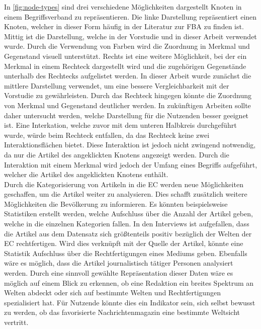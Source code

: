 In \autoref{fig:node-types} sind drei verschiedene Möglichkeiten dargestellt Knoten in einem Begriffsverband zu repräsentieren.
Die linke Darstellung repräsentiert einen Knoten, welcher in dieser Form häufig in der Literatur zur \ac{FBA} zu finden ist.
Mittig ist die Darstellung, welche in der Vorstudie und in dieser Arbeit verwendet wurde.
Durch die Verwendung von Farben wird die Zuordnung in Merkmal und Gegenstand visuell unterstützt.
Rechts ist eine weitere Möglichkeit, bei der ein Merkmal in einem Rechteck dargestellt wird und die zugehörigen Gegenstände unterhalb des Rechtecks aufgelistet werden.
In dieser Arbeit wurde zunächst die mittlere Darstellung verwendet, um eine bessere Vergleichbarkeit mit der Vorstudie zu gewährleisten.
Durch das Rechteck hingegen könnte die Zuordnung von Merkmal und Gegenstand deutlicher werden.
In zukünftigen Arbeiten sollte daher untersucht werden, welche Darstellung für die Nutzenden besser geeignet ist.
Eine Interkation, welche zuvor mit dem unteren Halbkreis durchgeführt wurde, würde beim Rechteck entfallen, da das Rechteck keine zwei Interaktionsflächen bietet.
Diese Interaktion ist jedoch nicht zwingend notwendig, da nur die Artikel des angeklickten Knotens angezeigt werden.
Durch die Interaktion mit einem Merkmal wird jedoch der Umfang eines Begriffs aufgeführt, welcher die Artikel des angeklickten Knotens enthält.\\

Durch die Kategorisierung von Artikeln in die \ac{EC} werden neue Möglichkeiten geschaffen, um die Artikel weiter zu analysieren.
Dies schafft zusätzlich weitere Möglichkeiten die Bevölkerung zu informieren.
Es könnten beispielsweise Statistiken erstellt werden, welche Aufschluss über die Anzahl der Artikel geben, welche in die einzelnen Kategorien fallen.
In den Interviews ist aufgefallen, dass die Artikel aus dem Datensatz sich größtenteils positiv bezüglich der Welten der \ac{EC} rechtfertigen.
Wird dies verknüpft mit der Quelle der Artikel, könnte eine Statistik Aufschluss über die Rechtfertigungen eines Mediums geben.
Ebenfalls wäre es möglich, dass die Artikel journalistisch tätiger Personen analysiert werden.
Durch eine sinnvoll gewählte Repräsentation dieser Daten wäre es möglich auf einem Blick zu erkennen, ob eine Redaktion ein breites Spektrum an Welten abdeckt oder sich auf bestimmte Welten und Rechtfertigungen spezialisiert hat.
Für Nutzende könnte dies ein Indikator sein, sich selbst bewusst zu werden, ob das favorisierte Nachrichtenmagazin eine bestimmte Weltsicht vertritt. \\

